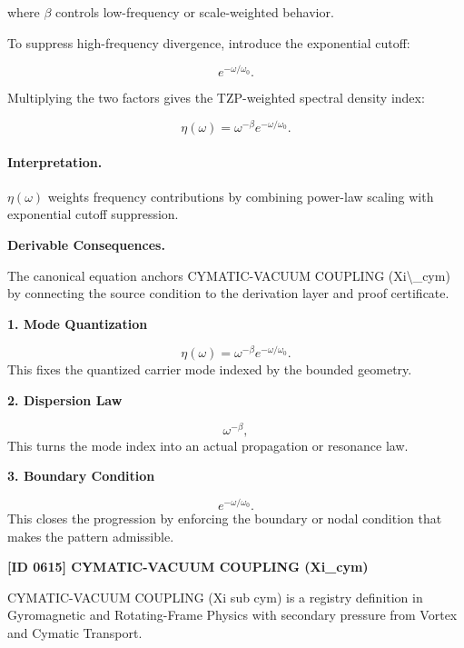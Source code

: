 where $\beta$ controls low-frequency or scale-weighted behavior.

To suppress high-frequency divergence, introduce the exponential cutoff:

\begin{equation}
e^{-\omega/\omega_0}.
\end{equation}

Multiplying the two factors gives the TZP-weighted spectral density index:

\begin{equation}
\boxed{
\eta(\omega)
=
\omega^{-\beta}
e^{-\omega/\omega_0}.
}
\end{equation}

\paragraph{Interpretation.}
$\eta(\omega)$ weights frequency contributions by combining power-law scaling with exponential cutoff suppression.

\par\vspace{0.35em}
\noindent\textbf{Derivable Consequences.}\quad
\begingroup
\footnotesize
\raggedright
The canonical equation anchors CYMATIC-VACUUM COUPLING (Xi\textbackslash{}\_cym) by connecting the source condition to the derivation layer and proof certificate.
\par\endgroup

\noindent\textbf{1. Mode Quantization}\par
\[
\eta(\omega) = \omega^{-\beta} e^{-\omega/\omega_0}.
\]
\noindent This fixes the quantized carrier mode indexed by the bounded geometry.\par
\noindent\textbf{2. Dispersion Law}\par
\[
\omega^{-\beta},
\]
\noindent This turns the mode index into an actual propagation or resonance law.\par
\noindent\textbf{3. Boundary Condition}\par
\[
e^{-\omega/\omega_0}.
\]
\noindent This closes the progression by enforcing the boundary or nodal condition that makes the pattern admissible.\par

\clearpage
\noindent\textbf{[ID 0615] CYMATIC-VACUUM COUPLING (Xi\_cym)}\par
\vspace{0.35em}
\begingroup\small
{}
CYMATIC-VACUUM COUPLING (Xi sub cym) is a registry definition in Gyromagnetic and Rotating-Frame Physics with secondary pressure from Vortex and Cymatic Transport.

